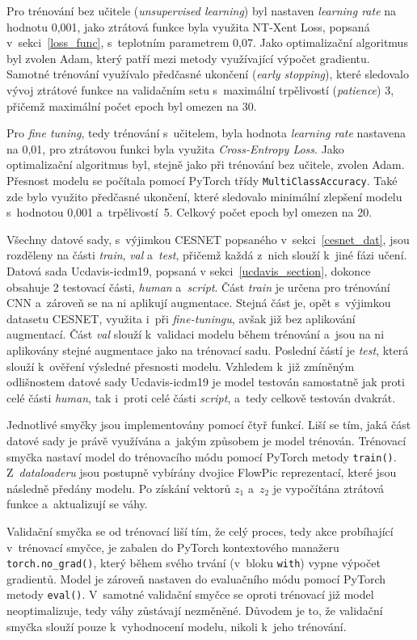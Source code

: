 Pro trénování bez učitele (\textit{unsupervised learning}) byl nastaven \textit{learning rate} na hodnotu 0,001, jako ztrátová funkce byla využita NT-Xent Loss, popsaná v~sekci~\ref{loss_func}, s~teplotním parametrem 0,07. Jako optimalizační algoritmus byl zvolen Adam, který patří mezi metody využívající výpočet gradientu. Samotné trénování využívalo předčasné ukončení (\textit{early stopping}), které sledovalo vývoj ztrátové funkce na validačním setu s~maximální trpělivostí (\textit{patience}) 3, přičemž maximální počet epoch byl omezen na 30.

Pro \textit{fine tuning}, tedy trénování s~učitelem, byla hodnota \textit{learning rate} nastavena na 0,01, pro ztrátovou funkci byla využita \textit{Cross-Entropy Loss}. Jako optimalizační algoritmus byl, stejně jako při trénování bez učitele, zvolen Adam. Přesnost modelu se počítala pomocí PyTorch třídy \texttt{MultiClassAccuracy}. Také zde bylo využito předčasné ukončení, které sledovalo minimální zlepšení modelu s~hodnotou 0,001 a~trpělivostí~5. Celkový počet epoch byl omezen na 20.

Všechny datové sady, s~výjimkou CESNET popsaného v~sekci~\ref{cesnet_dat}, jsou rozděleny na části \textit{train}, \textit{val} a~\textit{test}, přičemž každá z~nich slouží k~jiné fázi učení. Datová sada Ucdavis-icdm19, popsaná v sekci~\ref{ucdavis_section}, dokonce obsahuje 2 testovací části, \textit{human} a~\textit{script}. Část \textit{train} je určena pro trénování CNN a~zároveň se na ni aplikují augmentace. Stejná část je, opět s~výjimkou datasetu CESNET, využita i~při \textit{fine-tuningu}, avšak již bez aplikování augmentací. Část \textit{val} slouží k~validaci modelu během trénování a~jsou na ni aplikovány stejné augmentace jako na trénovací sadu. Poslední částí je \textit{test}, která slouží k~ověření výsledné přesnosti modelu. Vzhledem k~již zmíněným odlišnostem datové sady Ucdavis-icdm19 je model testován samostatně jak proti celé části \textit{human}, tak i~proti celé části \textit{script}, a~tedy celkově testován dvakrát.

Jednotlivé smyčky jsou implementovány pomocí čtyř funkcí. Liší se tím, jaká část datové sady je právě využívána a~jakým způsobem je model trénován. Trénovací smyčka nastaví model do trénovacího módu pomocí PyTorch metody \texttt{train()}. Z~\textit{dataloaderu} jsou postupně vybírány dvojice FlowPic reprezentací, které jsou následně předány modelu. Po získání vektorů $z_{1}$ a~$z_{2}$ je vypočítána ztrátová funkce a~aktualizují se váhy. 

Validační smyčka se od trénovací liší tím, že celý proces, tedy akce probíhající v~trénovací smyčce, je zabalen do PyTorch kontextového manažeru \texttt{torch.no\_grad()}, který během svého trvání (v~bloku \texttt{with}) vypne výpočet gradientů. Model je zároveň nastaven do evaluačního módu pomocí PyTorch metody \texttt{eval()}. V~samotné validační smyčce se oproti trénovací již model neoptimalizuje, tedy váhy zůstávají nezměněné. Důvodem je to, že validační smyčka slouží pouze k~vyhodnocení modelu, nikoli k~jeho trénování.

